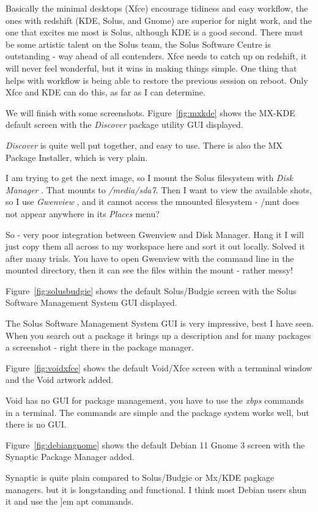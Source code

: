 \documentclass{article}  %
\begin{document}
Basically the minimal desktops (Xfce) encourage tidiness and easy workflow, the ones with redshift (KDE, Solus, and Gnome) are superior for night work, and the one that excites me most is Solus, although KDE is a good second. There must be some artistic talent on the Solus team, the Solus Software Centre is outstanding - way ahead of all contenders. Xfce needs to catch up on redshift, it will never feel wonderful, but it wins in making things simple. One thing that helps with workflow is being able to restore the previous session on reboot. Only Xfce and KDE can do this, as far as I can determine.

We will finish with some screenshots. Figure~\ref{fig:mxkde} shows the MX-KDE default screen with the {\em Discover} package utility GUI displayed.

{\em Discover} is quite well put together, and easy to use.  There is also the MX Package Installer, which is very plain.

I am trying to get the next image, so I mount the Solus filesystem with {\em Disk Manager} . That mounts to {\em /media/sda7}. Then I want to view the available shots, so I use {\em Gwenview} , and it cannot access the mnounted filesystem - /mnt does not appear anywhere in its {\em Places} menu?

So - very poor integration between Gwenview and  Disk Manager. Hang it I will just copy them all across to my workspace here and sort it out locally.  Solved it after many trials. You have to open Gwenview with the command line in the mounted directory, then it can see the files within the mount - rather messy!

Figure~\ref{fig:solusbudgie} shows the default Solus/Budgie screen with the Solus Software Management System GUI displayed.

The Solus Software Management System GUI is very impressive, best I have seen. When you search out a package it brings up a description and for many packages a screenshot - right there in the package manager.

Figure~\ref{fig:voidxfce} shows the default Void/Xfce screen with a termninal window and the Void artwork added.

 Void has no GUI for package management, you have to use the {\em xbps} commands in a terminal. The commands are simple and the package system works well, but there is no GUI.

Figure~\ref{fig:debiangnome} shows the default Debian 11 Gnome 3 screen with the Synaptic Package Manager added.

Synaptic is quite plain compared to Solus/Budgie or Mx/KDE pagkage managers. but it is longstanding and functional. I think most Debian users shun it and use the {]em apt} commands.
\end{document}
